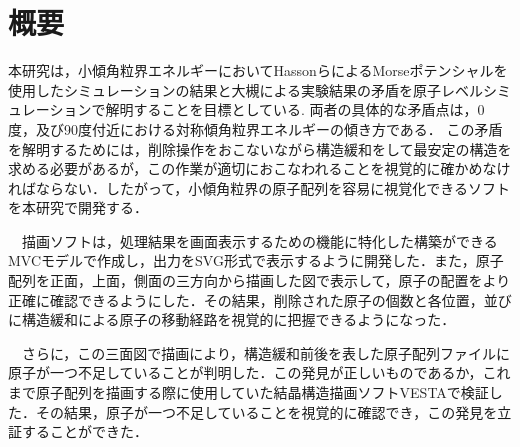 \section{概要}
本研究は，小傾角粒界エネルギーにおいてHassonらによるMorseポテンシャルを使用したシミュレーションの結果と大槻による実験結果の矛盾を原子レベルシミュレーションで解明することを目標としている.
両者の具体的な矛盾点は，0度，及び90度付近における対称傾角粒界エネルギーの傾き方である．
この矛盾を解明するためには，削除操作をおこないながら構造緩和をして最安定の構造を求める必要があるが，この作業が適切におこなわれることを視覚的に確かめなければならない．したがって，小傾角粒界の原子配列を容易に視覚化できるソフトを本研究で開発する．

　描画ソフトは，処理結果を画面表示するための機能に特化した構築ができるMVCモデルで作成し，出力をSVG形式で表示するように開発した．また，原子配列を正面，上面，側面の三方向から描画した図で表示して，原子の配置をより正確に確認できるようにした．その結果，削除された原子の個数と各位置，並びに構造緩和による原子の移動経路を視覚的に把握できるようになった．

　さらに，この三面図で描画により，構造緩和前後を表した原子配列ファイルに原子が一つ不足していることが判明した．この発見が正しいものであるか，これまで原子配列を描画する際に使用していた結晶構造描画ソフトVESTAで検証した．その結果，原子が一つ不足していることを視覚的に確認でき，この発見を立証することができた．

